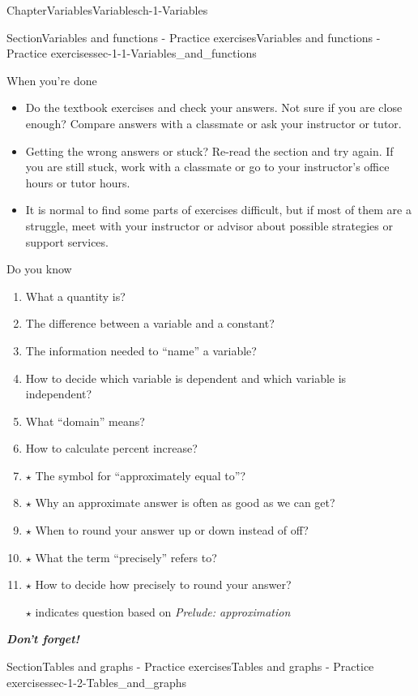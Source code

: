 \documentclass[twoside,11pt,]{book}
\newcommand{\alert}[1]{\textbf{\textit{#1}}}
\numberwithin{equation}{section}
\begin{document}
\begin{chapterptx}{Chapter}{Variables}{}{Variables}{}{}{ch-1-Variables}
\begin{sectionptx}{Section}{Variables and functions - Practice exercises}{}{Variables and functions - Practice exercises}{}{}{sec-1-1-Variables_and_functions}
\begin{conclusion}{When you're done \textellipsis{}}
\begin{itemize}[label=\textbullet]
\item{}Do the textbook exercises and check your answers. Not sure if you are close enough? Compare answers with a classmate or ask your instructor or tutor.%
\item{}Getting the wrong answers or stuck? Re-read the section and try again. If you are still stuck, work with a classmate or go to your instructor's office hours or tutor hours.%
\item{}It is normal to find some parts of exercises difficult, but if most of them are a struggle, meet with your instructor or advisor about possible strategies or support services.%
\end{itemize}
%
\end{conclusion}%
\begin{conclusion}{Do you know \textellipsis{}}%
%
\begin{enumerate}[label={\Alph*.}]
\item{}What a quantity is?%
\item{}The difference between a variable and a constant?%
\item{}The information needed to ``name'' a variable?%
\item{}How to decide which variable is dependent and which variable is independent?%
\item{}What ``domain'' means?%
\item{}How to calculate percent increase?%
\item{}\(\star\) The symbol for ``approximately equal to''?%
\item{}\(\star\) Why an approximate answer is often as good as we can get?%
\item{}\(\star\) When to round your answer up or down instead of off?%
\item{}\(\star\) What the term ``precisely'' refers to?%
\item{}\(\star\) How to decide how precisely to round your answer?%
\par
\(\star\) indicates question based on \emph{Prelude: approximation}%
\end{enumerate}
%
\par
\alert{Don't forget!}%
\end{conclusion}%
\end{sectionptx}
%
%
\typeout{************************************************}
\typeout{************************************************}
%
\begin{sectionptx}{Section}{Tables and graphs - Practice exercises}{}{Tables and graphs - Practice exercises}{}{}{sec-1-2-Tables_and_graphs}

\end{sectionptx}
\end{chapterptx}
\end{document}
